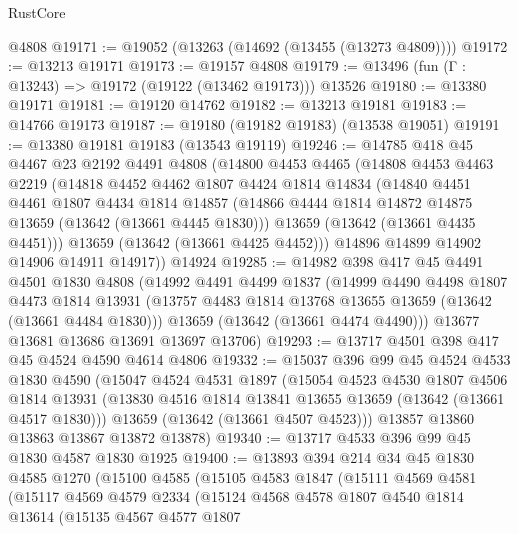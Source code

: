 \begin{lexlean}{RustCore}
\begin{coremodule}
    @4808
@19171 := @19052 (@13263 (@14692 (@13455 (@13273 @4809))))
@19172 := @13213 @19171
@19173 := @19157 @4808
@19179 := @13496 (fun (Γ : @13243) => @19172 (@19122 (@13462 @19173))) @13526
@19180 := @13380 @19171
@19181 := @19120 @14762
@19182 := @13213 @19181
@19183 := @14766 @19173
@19187 := @19180 (@19182 @19183) (@13538 @19051)
@19191 := @13380 @19181 @19183 (@13543 @19119)
@19246 := @14785
    @418
    @45
    @4467
    @23
    @2192
    @4491
    @4808
    (@14800
      @4453
      @4465
      (@14808
        @4453
        @4463
        @2219
        (@14818
          @4452
          @4462
          @1807
          @4424
          @1814
          @14834
          (@14840
            @4451
            @4461
            @1807
            @4434
            @1814
            @14857
            (@14866 @4444 @1814 @14872 @14875 @13659 (@13642 (@13661 @4445 @1830)))
            @13659
            (@13642 (@13661 @4435 @4451)))
          @13659
          (@13642 (@13661 @4425 @4452)))
        @14896
        @14899
        @14902
        @14906
        @14911
        @14917))
    @14924
@19285 := @14982
    @398
    @417
    @45
    @4491
    @4501
    @1830
    @4808
    (@14992
      @4491
      @4499
      @1837
      (@14999
        @4490
        @4498
        @1807
        @4473
        @1814
        @13931
        (@13757 @4483 @1814 @13768 @13655 @13659 (@13642 (@13661 @4484 @1830)))
        @13659
        (@13642 (@13661 @4474 @4490)))
      @13677
      @13681
      @13686
      @13691
      @13697
      @13706)
@19293 := @13717 @4501 @398 @417 @45 @4524 @4590 @4614 @4806
@19332 := @15037
    @396
    @99
    @45
    @4524
    @4533
    @1830
    @4590
    (@15047
      @4524
      @4531
      @1897
      (@15054
        @4523
        @4530
        @1807
        @4506
        @1814
        @13931
        (@13830 @4516 @1814 @13841 @13655 @13659 (@13642 (@13661 @4517 @1830)))
        @13659
        (@13642 (@13661 @4507 @4523)))
      @13857
      @13860
      @13863
      @13867
      @13872
      @13878)
@19340 := @13717 @4533 @396 @99 @45 @1830 @4587 @1830 @1925
@19400 := @13893
    @394
    @214
    @34
    @45
    @1830
    @4585
    @1270
    (@15100
      @4585
      (@15105
        @4583
        @1847
        (@15111
          @4569
          @4581
          (@15117
            @4569
            @4579
            @2334
            (@15124
              @4568
              @4578
              @1807
              @4540
              @1814
              @13614
              (@15135
                @4567
                @4577
                @1807

\end{coremodule}
\end{lexlean}
